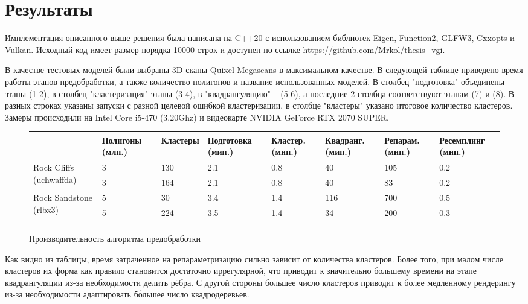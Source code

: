 \documentclass[12pt]{extarticle}
\begin{document}
\section{Результаты}
Имплементация описанного выше решения была написана на C++20 с использованием библиотек Eigen, Function2, GLFW3, Cxxopts и Vulkan. Исходный код имеет размер порядка 10000 строк и доступен по ссылке \url{https://github.com/Mrkol/thesis_vgi}.

В качестве тестовых моделей были выбраны 3D-сканы Quixel Megascans \cite{quixel_megascans} в максимальном качестве. В следующей таблице приведено время работы этапов предобработки, а также количество полигонов и название использованных моделей. В столбец "подготовка" объединены этапы (1-2), в столбец "кластеризация" этапы (3-4), в "квадрангуляцию" -- (5-6), а последние 2 столбца соответствуют этапам (7) и (8). В разных строках указаны запуски с разной целевой ошибкой кластеризации, в столбце "кластеры" указано итоговое количество кластеров. Замеры происходили на Intel Core i5-470 (3.20Ghz) и видеокарте NVIDIA GeForce RTX 2070 SUPER.

\begin{figure}[ht]
\small
\centering
\begin{tabular}{ l | p{16mm} | p{15mm} | p{17mm} | p{12mm} | p{14mm} | p{13mm} | p{17mm} }
                        & Полигоны (млн.) & Кластеры & Подготовка (мин.) & Кластер. (мин.) & Квадранг. (мин.) & Репарам. (мин.) & Ресемплинг (мин.) \\
\hline
\multirow{2}{18mm}{Rock Cliffs (uchwaffda)}
& 3    & 130 & 2.1   & 0.8  & 40   & 105    & 0.2   \\
& 3    & 164 & 2.1   & 0.8  & 40   & 83     & 0.2   \\
\hline
\multirow{3}{16mm}{Rock Sandstone (rlbx3)}
& 5    & 30  & 3.4   & 1.4  & 116  & 700    & 0.5   \\
& 5    & 224 & 3.5   & 1.4  & 34   & 200    & 0.3   \\
&&&&&&&\\
\end{tabular}
\caption{Производительность алгоритма предобработки}
\end{figure}

Как видно из таблицы, время затраченное на репараметризацию сильно зависит от количества кластеров. Более того, при малом числе кластеров их форма как правило становится достаточно иррегулярной, что приводит к значительно большему времени на этапе квадрангуляции из-за необходимости делить рёбра. С другой стороны большее число кластеров приводит к более медленному рендерингу из-за необходимости адаптировать б\'ольшее число квадродеревьев.
\end{document}
